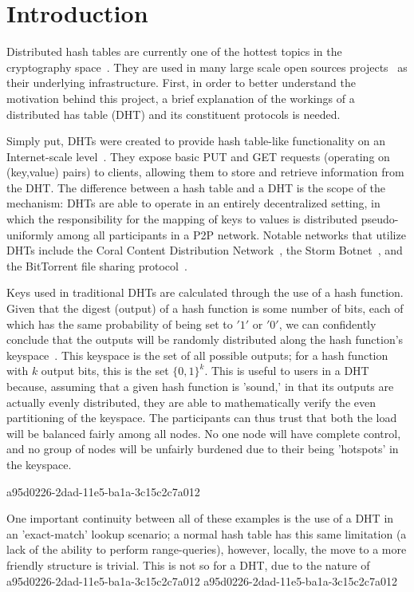 \documentclass[12pt]{article}
\begin{document}
\section{Introduction}
\par Distributed hash tables are currently one of the hottest topics in the cryptography space~\cite{Stoica:2001dj,Rowstron:2001ea,Ratnasamy:2001wn}. They are used in many large scale open sources projects~\cite{Freitas:2013tb,Xu:2010vs,Perfitt:2010fh} as their underlying infrastructure. First, in order to better understand the motivation behind this project, a brief explanation of the workings of a distributed has table (DHT) and its constituent protocols is needed.

\par Simply put, DHTs were created to provide hash table-like functionality on an Internet-scale level~\cite{Ratnasamy:2001wn}. They expose basic PUT and GET requests (operating on (key,value) pairs) to clients, allowing them to store and retrieve information from the DHT. The difference between a hash table and a DHT is the scope of the mechanism: DHTs are able to operate in an entirely decentralized setting, in which the responsibility for the mapping of keys to values is distributed pseudo-uniformly among all participants in a P2P network. Notable networks that utilize DHTs include the Coral Content Distribution Network~\cite{Freedman:2004vb}, the Storm Botnet~\cite{Holz:2008uk}, and the BitTorrent file sharing protocol~\cite{Cohen:y1_8mBnw}.

\par Keys used in traditional DHTs are calculated through the use of a hash function. Given that the digest (output) of a hash function is some number of bits, each of which has the same probability of being set to $'1'$ or $'0'$, we can confidently conclude that the outputs will be randomly distributed along the hash function's keyspace~. This keyspace is the set of all possible outputs; for a hash function with $k$ output bits, this is the set $\{0,1\}^k$. This is useful to users in a DHT because, assuming that a given hash function is 'sound,' in that its outputs are actually evenly distributed, they are able to mathematically verify the even partitioning of the keyspace. The participants can thus trust that both the load will be balanced fairly among all nodes. No one node will have complete control, and no group of nodes will be unfairly burdened due to their being 'hotspots' in the keyspace.~

a95d0226-2dad-11e5-ba1a-3c15c2c7a012\par One important continuity between all of these examples is the use of a DHT in an 'exact-match' lookup scenario; a normal hash table has this same limitation (a lack of the ability to perform range-queries), however, locally, the move to a more friendly structure is trivial. This is not so for a DHT, due to the nature of
a95d0226-2dad-11e5-ba1a-3c15c2c7a012\printbibliography
a95d0226-2dad-11e5-ba1a-3c15c2c7a012
\end{document}
